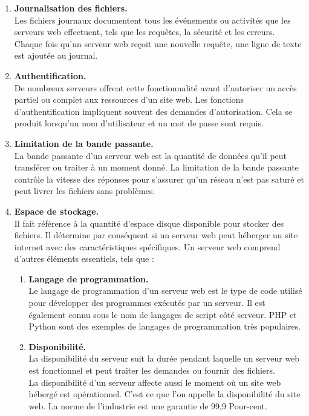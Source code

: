 \begin{enumerate}
	\item \textbf{ Journalisation des fichiers.\\} Les fichiers journaux documentent tous les événements ou activités que les serveurs web effectuent, tels que les requêtes, la sécurité et les erreurs. Chaque fois qu’un serveur web reçoit une nouvelle requête, une ligne de texte est ajoutée au journal.
	 
	 \item \textbf{ Authentification.\\} De nombreux serveurs offrent cette fonctionnalité avant d’autoriser un accès partiel ou complet aux ressources d’un site web. Les fonctions d’authentification impliquent souvent des demandes d’autorisation. Cela se produit lorsqu’un nom d’utilisateur et un mot de passe sont requis.
	 
	 \item \textbf{Limitation de la bande passante.\\} La bande passante d’un serveur web est la quantité de données qu’il peut transférer ou traiter à un moment donné. La limitation de la bande passante contrôle la vitesse des réponses pour s’assurer qu’un réseau n’est pas saturé et peut livrer les fichiers sans problèmes.
	 
	 \item \textbf{ Espace de stockage.\\} Il fait référence à la quantité d’espace disque disponible pour stocker des fichiers. Il détermine par conséquent si un serveur web peut héberger un site internet avec des caractéristiques spécifiques.
	 Un serveur web comprend d’autres éléments essentiels, tels que :
	 \begin{enumerate}
	 \item \textbf{Langage de programmation.\\} Le langage de programmation d’un serveur web est le type de code utilisé pour développer des programmes exécutés par un serveur. Il est également connu sous le nom de langages de script côté serveur. PHP et Python sont des exemples de langages de programmation très populaires.
	 \item \textbf{Disponibilité.\\} La disponibilité du serveur suit la durée pendant laquelle un serveur web est fonctionnel et peut traiter les demandes ou fournir des fichiers. \\
	 \subitem La disponibilité d’un serveur affecte aussi le moment où un site web hébergé est opérationnel. C’est ce que l’on appelle la disponibilité du site web. La norme de l’industrie est une garantie de 99,9 Pour-cent.
	\end{enumerate}
\end{enumerate}
